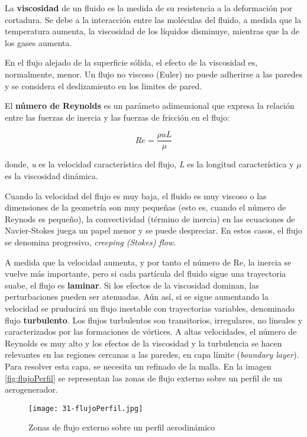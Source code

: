 La \textbf{viscosidad} de un fluido es la medida de su resistencia a la
deformación por cortadura. Se debe a la interacción entre las moléculas
del fluido, a medida que la temperatura aumenta, la viscosidad de los
líquidos disminuye, mientras que la de los gases aumenta.

En el flujo alejado de la superficie sólida, el efecto de la viscosidad
es, normalmente, menor. Un flujo no viscoso (Euler) no puede adherirse a
las paredes y se considera el deslizamiento en los limites de pared.

El \textbf{número de Reynolds} es un parámeto adimensional que expresa
la relación entre las fuerzas de inercia y las fuerzas de fricción en el
flujo:

\[Re= \frac{\rho u L}{\mu}\]

donde, \emph{u} es la velocidad característica del flujo, \emph{L} es la
longitud característica y \(\mu\) es la viscosidad dinámica.

Cuando la velocidad del flujo es muy baja, el fluido es muy viscoso o
las dimensiones de la geometría son muy pequeñas (esto es, cuando el
número de Reynods es pequeño), la convectividad (término de inercia) en
las ecuaciones de Navier-Stokes juega un papel menor y se puede
despreciar. En estos casos, el flujo se denomina progresivo,
\emph{creeping (Stokes) flow}.

A medida que la velocidad aumenta, y por tanto el número de Re, la
inercia se vuelve más importante, pero si cada partícula del fluido
sigue una trayectoria suabe, el flujo es \textbf{laminar}. Si los
efectos de la viscosidad dominan, las perturbaciones pueden ser
atenuadas. Aún así, si se sigue aumentando la velocidad se pruducirá un
flujo inestable con trayectorias variables, denominado flujo
\textbf{turbulento}. Los flujos turbulentos son transitorios,
irregulares, no lineales y caracterizados por las formaciones de
vórtices. A altas velocidades, el número de Reynolds es muy alto y los
efectos de la viscosidad y la turbulencia se hacen relevantes en las
regiones cercanas a las paredes, en capa límite (\emph{boundary layer}).
Para resolver esta capa, se necesita un refinado de la malla. En la imagen \autoref{fig:flujoPerfil} se representan las zonas de flujo externo sobre un perfil de un aerogenerador. 

\begin{figure}
\centering
\texttt{[image: 31-flujoPerfil.jpg]}
\caption{Zonas de flujo externo sobre un perfil aerodinámico}
\label{fig:flujoPerfil}
\end{figure}

